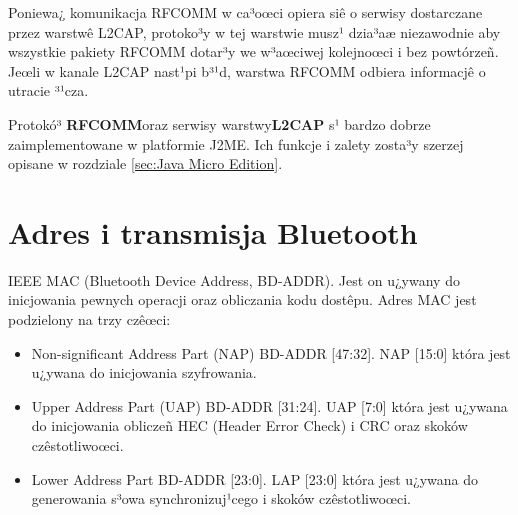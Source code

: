 Poniewa¿ komunikacja RFCOMM w ca³oœci opiera siê o serwisy
dostarczane przez warstwê L2CAP, protoko³y w tej warstwie musz¹
dzia³aæ niezawodnie aby wszystkie pakiety RFCOMM dotar³y we
w³aœciwej kolejnoœci i bez powtórzeñ. Jeœli w kanale L2CAP nast¹pi
b³¹d, warstwa RFCOMM odbiera informacjê o utracie ³¹cza.

Protokó³\textbf{ RFCOMM}oraz serwisy warstwy\textbf{L2CAP} s¹ bardzo
dobrze zaimplementowane w platformie J2ME. Ich funkcje i zalety
zosta³y szerzej opisane w rozdziale \ref{sec:Java Micro Edition}.

\section{Adres i transmisja Bluetooth}\label{sec:Adres Bluetooth}
IEEE MAC (Bluetooth Device Address, BD-ADDR). Jest on u¿ywany do
inicjowania pewnych operacji oraz obliczania kodu dostêpu. Adres MAC
jest podzielony na trzy czêœci:
\begin{itemize}
\item  Non-significant Address Part (NAP)
BD-ADDR [47:32]. NAP [15:0] która jest u¿ywana do inicjowania
szyfrowania.
\item  Upper Address Part (UAP)
BD-ADDR [31:24]. UAP [7:0] która jest u¿ywana do inicjowania
obliczeñ HEC (Header Error Check) i CRC oraz skoków czêstotliwoœci.
\item Lower Address Part
BD-ADDR [23:0]. LAP [23:0] która jest u¿ywana do generowania s³owa
synchronizuj¹cego i skoków czêstotliwoœci.
\end{itemize}

